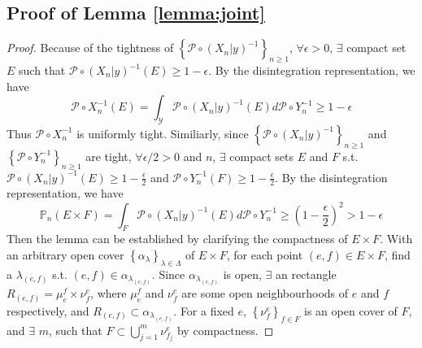 \documentclass[12pt, A4]{article}
\newcommand{\Parentheses}[1]{ \left( #1 \right) }
\newcommand{\Curlybracket}[1]{ \left\{ #1 \right\} }
\begin{document}
    \subsection{Proof of Lemma \ref{lemma:joint}}
    \begin{proof}
        Because of the tightness of $\Curlybracket{\mathcal{P}\circ \Parentheses{X_n | y}^{-1}}_{n\geq1}$, $\forall \epsilon > 0$, $\exists$ compact set $E$ such that $\mathcal{P}\circ \Parentheses{X_n | y}^{-1}\Parentheses{E}\geq 1-\epsilon$.
        By the disintegration representation, we have
        $$
            \mathcal{P}\circ X_n^{-1} \Parentheses{E} = \int_{\mathcal{Y}} \mathcal{P}\circ\Parentheses{X_n|y}^{-1}(E) d \mathcal{P}\circ Y_n^{-1} \geq 1 - \epsilon 
        $$
        Thus $\mathcal{P}\circ X_n^{-1}$ is uniformly tight.
        Similiarly, since $\Curlybracket{\mathcal{P}\circ \Parentheses{X_n | y}^{-1}}_{n\geq1}$ and $\Curlybracket{\mathcal{P}\circ Y_n^{-1}}_{n\geq1}$ are tight, $\forall \epsilon/2 > 0$ and $n$, $\exists$ compact sets $E$ and $F$ s.t. $\mathcal{P}\circ \Parentheses{X_n | y}^{-1}\Parentheses{E}\geq 1-\frac{\epsilon}{2}$ and $\mathcal{P}\circ Y_n^{-1}\Parentheses{F}\geq 1-\frac{\epsilon}{2}$.
        By the disintegration representation, we have
        $$
            \mathbb{P}_n \Parentheses{E \times F} = \int_{F} \mathcal{P}\circ\Parentheses{X_n|y}^{-1}(E) d \mathcal{P}\circ Y_n^{-1} \geq \Parentheses{1-\frac{\epsilon}{2}}^2 > 1 - \epsilon 
        $$
        Then the lemma can be established by clarifying the compactness of $E \times F$. 
        With an arbitrary open cover $\Curlybracket{ \alpha_{\lambda} }_{\lambda \in \Lambda}$ of $E \times F$, for each point $(e,f) \in E \times F$, find a $\lambda_{(e,f)}$ s.t. $(e,f) \in \alpha_{\lambda_{(e,f)}}$. 
        Since $\alpha_{\lambda_{(e,f)}}$ is open, $\exists$ an rectangle $R_{(e,f)} = \mu_{e}^{f} \times \nu_{f}^{e}$, where $\mu_{e}^{f}$ and $\nu_{f}^{e}$ are some open neighbourhoods of $e$ and $f$ respectively, and $R_{(e,f)} \subset \alpha_{\lambda_{(e,f)}}$. 
        For a fixed $e$, $\Curlybracket{\nu_f^e}_{f\in F}$ is an open cover of $F$, and $\exists$ $m$, such that $F \subset \bigcup_{j = 1}^m \nu_{f_j}^e$ by compactness.  

\end{proof}
\end{document}
